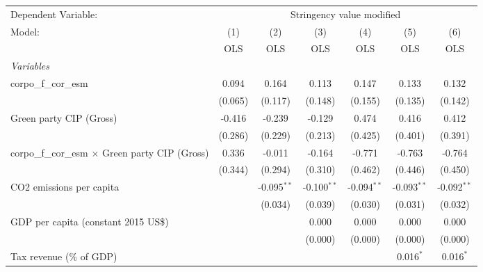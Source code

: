
\begingroup
\centering
\begin{tabular}{lcccccc}
   \toprule
   Dependent Variable: & \multicolumn{6}{c}{Stringency value modified}\\
   Model:                                                  & (1)     & (2)           & (3)           & (4)           & (5)           & (6)\\  
                                                           &  OLS    & OLS           & OLS           & OLS           & OLS           & OLS\\  
   \midrule
   \emph{Variables}\\
   corpo\_f\_cor\_esm                                      & 0.094   & 0.164         & 0.113         & 0.147         & 0.133         & 0.132\\   
                                                           & (0.065) & (0.117)       & (0.148)       & (0.155)       & (0.135)       & (0.142)\\   
   Green party CIP (Gross)                                 & -0.416  & -0.239        & -0.129        & 0.474         & 0.416         & 0.412\\   
                                                           & (0.286) & (0.229)       & (0.213)       & (0.425)       & (0.401)       & (0.391)\\   
   corpo\_f\_cor\_esm $\times$ Green party CIP (Gross)     & 0.336   & -0.011        & -0.164        & -0.771        & -0.763        & -0.764\\   
                                                           & (0.344) & (0.294)       & (0.310)       & (0.462)       & (0.446)       & (0.450)\\   
   CO2 emissions per capita                                &         & -0.095$^{**}$ & -0.100$^{**}$ & -0.094$^{**}$ & -0.093$^{**}$ & -0.092$^{**}$\\   
                                                           &         & (0.034)       & (0.039)       & (0.030)       & (0.031)       & (0.032)\\   
   GDP per capita (constant 2015 US\$)                     &         &               & 0.000         & 0.000         & 0.000         & 0.000\\   
                                                           &         &               & (0.000)       & (0.000)       & (0.000)       & (0.000)\\   
   Tax revenue (\% of GDP)                                 &         &               &               &               & 0.016$^{*}$   & 0.016$^{*}$\\   

\end{tabular}
